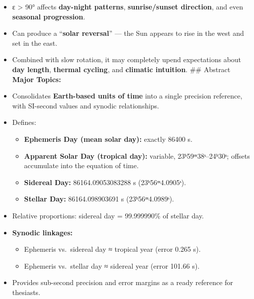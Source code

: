 \documentclass[
  letterpaper,
]{book}
\providecommand{\tightlist}{%
  \setlength{\itemsep}{0pt}\setlength{\parskip}{0pt}}
\begin{document}
\begin{itemize}
\tightlist
\item
  ε \textgreater{} 90° affects \textbf{day-night patterns},
  \textbf{sunrise/sunset direction}, and even \textbf{seasonal
  progression}.
\item
  Can produce a ``\textbf{solar reversal}'' --- the Sun appears to rise
  in the west and set in the east.
\item
  Combined with slow rotation, it may completely upend expectations
  about \textbf{day length}, \textbf{thermal cycling}, and
  \textbf{climatic intuition}. \#\# Abstract\\
  \textbf{Major Topics:}\\
\item
  Consolidates \textbf{Earth-based units of time} into a single
  precision reference, with SI-second values and synodic
  relationships.\\
\item
  Defines:

  \begin{itemize}
  \tightlist
  \item
    \textbf{Ephemeris Day (mean solar day):} exactly 86400 s.\\
  \item
    \textbf{Apparent Solar Day (tropical day):} variable,
    23ʰ59ᵐ38ˢ--24ʰ30ˢ; offsets accumulate into the equation of time.\\
  \item
    \textbf{Sidereal Day:} 86164.09053083288 s (23ʰ56ᵐ4.0905ˢ).\\
  \item
    \textbf{Stellar Day:} 86164.098903691 s (23ʰ56ᵐ4.0989ˢ).\\
  \end{itemize}
\item
  Relative proportions: sidereal day = 99.999990\% of stellar day.\\
\item
  \textbf{Synodic linkages:}

  \begin{itemize}
  \tightlist
  \item
    Ephemeris vs.~sidereal day ≈ tropical year (error 0.265 s).\\
  \item
    Ephemeris vs.~stellar day ≈ sidereal year (error 101.66 s).\\
  \end{itemize}
\item
  Provides sub-second precision and error margins as a ready reference
  for thesiasts.
\end{itemize}
\end{document}
